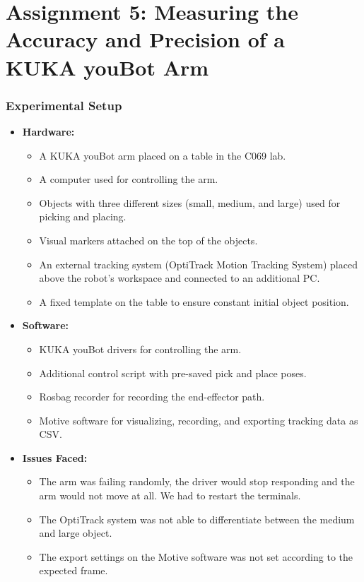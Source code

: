\clearpage
\part{Assignment 5: Measuring the Accuracy and Precision of a KUKA youBot Arm}

\section{Experimental Setup}
\begin{itemize}
    \item \textbf{Hardware:}
    \begin{itemize}
        \item A KUKA youBot arm placed on a table in the C069 lab.
        \item A computer used for controlling the arm.
        \item Objects with three different sizes (small, medium, and large) used for picking and placing.
        \item Visual markers attached on the top of the objects.
        \item An external tracking system (OptiTrack Motion Tracking System) placed above the robot’s workspace and connected to an additional PC.
        \item A fixed template on the table to ensure constant initial object position.
    \end{itemize}
    \item \textbf{Software:}
    \begin{itemize}
        \item KUKA youBot drivers for controlling the arm.
        \item Additional control script with pre-saved pick and place poses.
        \item Rosbag recorder for recording the end-effector path.
        \item Motive software for visualizing, recording, and exporting tracking data as CSV.
    \end{itemize}
    
    \item \textbf{Issues Faced:} 
    \begin{itemize}
        \item The arm was failing randomly, the driver would stop responding and the arm would not move at all. We had to restart the terminals.
        \item The OptiTrack system was not able to differentiate between the medium and large object.
        \item The export settings on the Motive software was not set according to the expected frame.
    \end{itemize}
\end{itemize}



